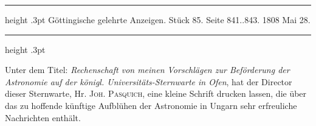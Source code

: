 \par\bigskip
{}
\hypertarget{native-502-lower}{}\label{native-502-lower}
\begin{center}
\parbox{.77\linewidth}{%
\centering\small
\hrule height .3pt\relax\vspace{2.5pt}
Göttingische gelehrte Anzeigen. Stück 85. Seite 841..843. 1808 Mai 28.\par
\vspace{2.5pt}\hrule height .3pt\relax
}
\end{center}

Unter dem Titel: \emph{Rechenschaft von meinen Vorschlägen zur Beförderung der Astronomie auf der königl. Universitäts-Sternwarte in Ofen}, hat der Director dieser Sternwarte, Hr. \textsc{Joh. Pasquich}, eine kleine Schrift drucken lassen, die über das zu hoffende künftige Aufblühen der Astronomie in Ungarn sehr erfreuliche Nachrichten enthält.

